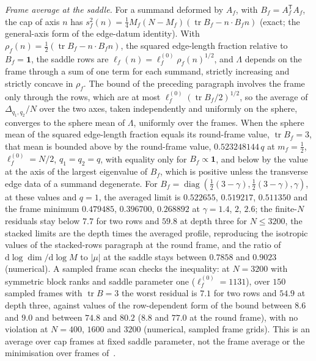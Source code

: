 \emph{Frame average at the saddle.} For a summand deformed by \(A_f\), with \(B_f=A_f^{\mathsf T}A_f\), the cap of axis \(n\) has \(s_f^2(n)=\tfrac14M_f(N-M_f)(\operatorname{tr}B_f-n\cdot B_fn)\) (exact; the general-axis form of the edge-datum identity). With \(\rho_f(n)=\tfrac12(\operatorname{tr}B_f-n\cdot B_fn)\), the squared edge-length fraction relative to \(B_f=\mathbf 1\), the saddle rows are \(\ell_f(n)=\ell_f^{(0)}\rho_f(n)^{1/2}\), and \(\Lambda\) depends on the frame through a sum of one term for each summand, strictly increasing and strictly concave in \(\rho_f\). The bound of the preceding paragraph involves the frame only through the rows, which are at most \(\ell_f^{(0)}(\operatorname{tr}B_f/2)^{1/2}\), so the average of \(\Delta_{q_1,q_2}/N\) over the two axes, taken independently and uniformly on the sphere, converges to the sphere mean of \(\Lambda\), uniformly over the frames. When the sphere mean of the squared edge-length fraction equals its round-frame value, \(\operatorname{tr}B_f=3\), that mean is bounded above by the round-frame value, \(0.523248144\,q\) at \(m_f=\tfrac12\), \(\ell_f^{(0)}=N/2\), \(q_1=q_2=q\), with equality only for \(B_f\propto\mathbf 1\), and below by the value at the axis of the largest eigenvalue of \(B_f\), which is positive unless the transverse edge data of a summand degenerate. For \(B_f=\operatorname{diag}(\tfrac12(3-\gamma),\tfrac12(3-\gamma),\gamma)\), at these values and \(q=1\), the averaged limit is \(0.522655\), \(0.519217\), \(0.511350\) and the frame minimum \(0.479485\), \(0.396700\), \(0.268892\) at \(\gamma=1.4\), \(2\), \(2.6\); the finite-\(N\) residuals stay below \(7.7\) for two rows and \(59.8\) at depth three for \(N\le3200\), the stacked limits are the depth times the averaged profile, reproducing the isotropic values of the stacked-rows paragraph at the round frame, and the ratio of \(\mathrm d\log\dim/\mathrm d\log M\) to \(|\mu|\) at the saddle stays between \(0.7858\) and \(0.9023\) (numerical). A sampled frame scan checks the inequality: at \(N=3200\) with symmetric block ranks and saddle parameter one (\(\ell_f^{(0)}=1131\)), over \(150\) sampled frames with \(\operatorname{tr}B=3\) the worst residual is \(7.1\) for two rows and \(54.9\) at depth three, against values of the row-dependent form of the bound between \(8.6\) and \(9.0\) and between \(74.8\) and \(80.2\) (\(8.8\) and \(77.0\) at the round frame), with no violation at \(N=400\), \(1600\) and \(3200\) (numerical, sampled frame grids). This is an average over cap frames at fixed saddle parameter, not the frame average or the minimisation over frames of~\cite{FlissFrenkelHartnollSoni2025}.

